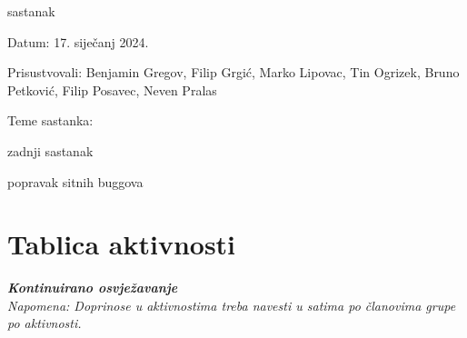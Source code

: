 \begin{packed_enum}
				\item  sastanak
			\item[] \begin{packed_item}
				\item Datum: 17. siječanj 2024.
				\item Prisustvovali: Benjamin Gregov, Filip Grgić, Marko Lipovac, Tin Ogrizek, Bruno Petković, Filip Posavec, Neven Pralas
				\item Teme sastanka:
				\begin{packed_item}
					\item  zadnji sastanak
					\item  popravak sitnih buggova
				\end{packed_item}
			\end{packed_item}
			
			
		\end{packed_enum}
		
		\eject
		\section*{Tablica aktivnosti}
		
			\textbf{\textit{Kontinuirano osvježavanje}}\\
			
			 \textit{Napomena: Doprinose u aktivnostima treba navesti u satima po članovima grupe po aktivnosti.}

